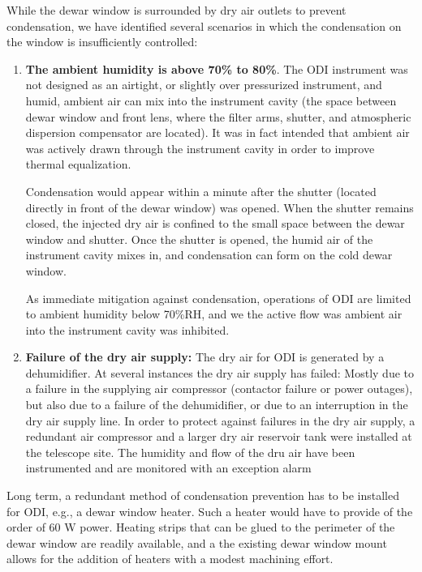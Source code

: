 \documentclass[]{spieman}
\begin{document}
While the dewar window is surrounded by dry air outlets to prevent condensation,
we have identified several scenarios in which the condensation  on the window is 
insufficiently controlled:

\begin{enumerate}
\item {\bf The ambient humidity is above 70\% to 80\%}. The ODI instrument was
not designed as an airtight, or slightly over pressurized instrument, and humid,
ambient air can mix into the instrument cavity (the space between dewar window
and front lens, where the filter arms, shutter, and atmospheric dispersion
compensator are located). It was in fact intended that ambient air was actively drawn
through	the instrument cavity in order to improve thermal equalization.

Condensation would  appear within a minute after the shutter (located directly
in front of the dewar window) was opened. When the shutter remains closed, the
injected dry air is confined to the small space between the dewar window and
shutter. Once the shutter is opened, the  humid air of the instrument cavity
mixes in, and condensation can form on the cold dewar window.

As immediate mitigation against condensation, operations of ODI are limited to
ambient humidity below 70\%RH, and we the active flow was ambient air into the
instrument cavity was inhibited.

\item {\bf Failure of the dry air supply:} The dry air for ODI is generated by a
dehumidifier. At several instances the dry air supply has failed: Mostly due to
a failure in the supplying air compressor (contactor failure or power outages),
but also due to a failure of the dehumidifier, or due to an interruption in the
dry air supply line. In order to protect against failures in the dry air supply,
a redundant air compressor and a larger dry air reservoir tank were installed at
the telescope site. The humidity and flow of the dru air have been instrumented
and are monitored with an exception alarm

\end{enumerate}

Long term, a redundant method of condensation prevention has to be installed for
ODI, e.g., a dewar window heater. Such a heater would have to provide of the
order of 60 W power. Heating strips that can be glued to the perimeter of the
dewar window are readily available, and a the existing dewar window mount allows
for the addition of heaters with a modest machining effort.
\end{document}
